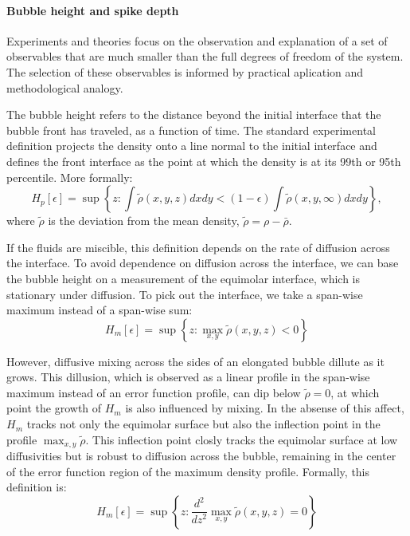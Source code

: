 \paragraph{Bubble height and spike depth}

Experiments and theories focus on the observation and explanation of a set of observables that are much smaller than the full degrees of freedom of the system.
The selection of these observables is informed by practical aplication and methodological analogy.

The bubble height refers to the distance beyond the initial interface that the bubble front has traveled, as a function of time.
The standard experimental definition projects the density onto a line normal to the initial interface and defines the front interface as the point at which the density is at its 99th or 95th percentile.
More formally:
\begin{equation}
H_p[\epsilon] = \sup \left\{z : \int \tilde\rho(x,y,z) dx dy < (1-\epsilon) \int \tilde\rho(x,y,\infty) dx dy \right\},
\end{equation}
where $\tilde\rho$ is the deviation from the mean density, $\tilde\rho = \rho - \bar\rho$.

If the fluids are miscible, this definition depends on the rate of diffusion across the interface.
To avoid dependence on diffusion across the interface, we can base the bubble height on a measurement of the equimolar interface, which is stationary under diffusion.
To pick out the interface, we take a span-wise maximum instead of a span-wise sum:
\begin{equation}
H_m[\epsilon] = \sup \left\{z : \max_{x,y} \tilde\rho(x,y,z) < 0 \right\}
\end{equation}

However, diffusive mixing across the sides of an elongated bubble dillute as it grows.
This dillusion, which is observed as a linear profile in the span-wise maximum instead of an error function profile, can dip below $\tilde\rho = 0$, at which point the growth of $H_m$ is also influenced by mixing.
In the absense of this affect, $H_{m}$ tracks not only the equimolar surface but also the inflection point in the profile $\max_{x,y} \tilde \rho$.
This inflection point closly tracks the equimolar surface at low diffusivities but is robust to diffusion across the bubble, remaining in the center of the error function region of the maximum density profile.
Formally, this definition is:
\begin{equation}
H_m[\epsilon] = \sup \left\{z : \frac{d^2}{dz^2} \max_{x,y} \tilde\rho(x,y,z) = 0 \right\}
\end{equation}

